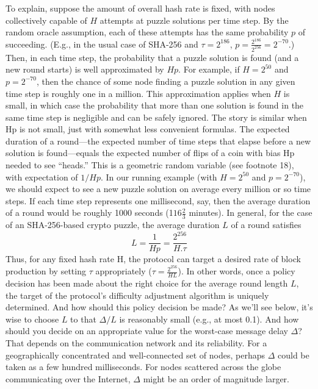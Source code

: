 To explain, suppose the amount of overall hash rate is fixed, with nodes collectively capable of $H$ attempts at puzzle solutions per time step. By the random oracle assumption,
each of these attempts has the same probability $p$ of succeeding. (E.g., in the usual case
of SHA-256 and $\tau = 2^{186}$, $p = \frac{2^{186}}{2^{256}} = 2^{-70}$.) Then, in each time step, the probability
that a puzzle solution is found (and a new round starts) is well approximated by $Hp$. For
example, if $H = 2^{50}$ and $p = 2^{-70}$, then the chance of some node finding a puzzle solution in
any given time step is roughly one in a million. This approximation applies when $H$ is small, in which case the probability that more than one solution
is found in the same time step is negligible and can be safely ignored. The story is similar when Hp is not
small, just with somewhat less convenient formulas.
The expected duration of a round—the expected number of time steps that elapse before a new solution is found—equals the expected
number of flips of a coin with bias Hp needed to see “heads.” This is a geometric random
variable (see footnote 18), with expectation of $1/Hp$. In our running example (with $H = 2^{50}$
and $p = 2^{-70}$), we should expect to see a new puzzle solution on average every million or so
time steps. If each time step represents one millisecond, say, then the average duration of a
round would be roughly 1000 seconds (1$16 \frac{2}{3}$ minutes).
In general, for the case of an SHA-256-based crypto puzzle, the average duration $L$ of a
round satisfies
$$L = \frac{1}{Hp} = \frac{2^{256}}{H.\tau}$$
Thus, for any fixed hash rate H, the protocol can target a desired rate of block production
by setting $\tau$ appropriately ($\tau = \frac{2^{256}}{HL}$). In other words, once a policy decision has been
made about the right choice for the average round length $L$, the target of the protocol’s
difficulty adjustment algorithm is uniquely determined. And how should this policy decision be made? As we’ll see below, it’s wise to choose $L$ to that $\Delta/L$ is reasonably small (e.g., at most 0.1). And how should you decide on an appropriate value for the worst-case message delay $\Delta$? That depends
on the communication network and its reliability. For a geographically concentrated and well-connected set
of nodes, perhaps $\Delta$ could be taken as a few hundred milliseconds. For nodes scattered across the globe
communicating over the Internet, $\Delta$ might be an order of magnitude larger.

